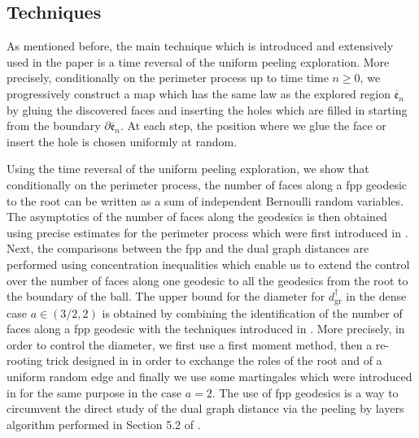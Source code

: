 \documentclass[11pt]{article}
\numberwithin{equation}{section}
\begin{document}
{
\subsection{Techniques} 
As mentioned before, the main technique which is introduced and extensively used in the paper is a time reversal of the uniform peeling exploration. More precisely, conditionally on the perimeter process up to time time $n\ge 0$, we progressively construct a map which has the same law as the explored region $\overline{\mathfrak{e}}_n$ by gluing the discovered faces and inserting the holes which are filled in starting from the boundary $\partial \overline{\mathfrak{e}}_n$. At each step, the position where we glue the face or insert the hole is chosen uniformly at random. 

Using the time reversal of the uniform peeling exploration, we show that conditionally on the perimeter process, the number of faces along a fpp geodesic to the root can be written as a sum of independent Bernoulli random variables. The asymptotics of the number of faces along the geodesics is then obtained using precise estimates for the perimeter process which were first introduced in \cite{BCM}. Next, the comparisons between the fpp and the dual graph distances are performed using concentration inequalities which enable {us} to extend the control over the number of faces along one geodesic to all the geodesics from the root to the boundary of the ball. The upper bound {for} the diameter for $d^\dagger_\mathrm{gr}$ in the dense case $a \in (3/2,2)$ is obtained by combining the identification of the number of faces along a fpp geodesic with the techniques introduced in \cite{Kam23}. More precisely, in order to control the diameter, we first use a first moment method, then a re-rooting trick designed in \cite{Kam23} in order to exchange the roles of the root and of a uniform random edge and finally we use some martingales which were introduced in \cite{Kam23} for the same purpose in the case $a=2$. The use of fpp geodesics {is a way} to circumvent the direct study of the dual graph distance via the peeling by layers algorithm performed in Section 5.2 of \cite{BC}.

}
\end{document}
